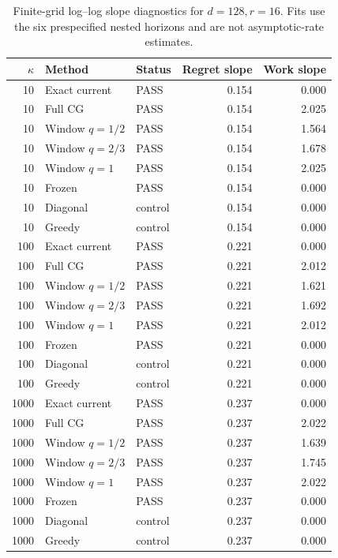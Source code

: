 \begin{table}[p]
\centering\scriptsize
\begin{tabular}{rllrr}
\toprule
$\kappa$ & Method & Status & Regret slope & Work slope \\
\midrule
10 & Exact current & PASS & 0.154 & 0.000 \\
10 & Full CG & PASS & 0.154 & 2.025 \\
10 & Window $q=1/2$ & PASS & 0.154 & 1.564 \\
10 & Window $q=2/3$ & PASS & 0.154 & 1.678 \\
10 & Window $q=1$ & PASS & 0.154 & 2.025 \\
10 & Frozen & PASS & 0.154 & 0.000 \\
10 & Diagonal & control & 0.154 & 0.000 \\
10 & Greedy & control & 0.154 & 0.000 \\
100 & Exact current & PASS & 0.221 & 0.000 \\
100 & Full CG & PASS & 0.221 & 2.012 \\
100 & Window $q=1/2$ & PASS & 0.221 & 1.621 \\
100 & Window $q=2/3$ & PASS & 0.221 & 1.692 \\
100 & Window $q=1$ & PASS & 0.221 & 2.012 \\
100 & Frozen & PASS & 0.221 & 0.000 \\
100 & Diagonal & control & 0.221 & 0.000 \\
100 & Greedy & control & 0.221 & 0.000 \\
1000 & Exact current & PASS & 0.237 & 0.000 \\
1000 & Full CG & PASS & 0.237 & 2.022 \\
1000 & Window $q=1/2$ & PASS & 0.237 & 1.639 \\
1000 & Window $q=2/3$ & PASS & 0.237 & 1.745 \\
1000 & Window $q=1$ & PASS & 0.237 & 2.022 \\
1000 & Frozen & PASS & 0.237 & 0.000 \\
1000 & Diagonal & control & 0.237 & 0.000 \\
1000 & Greedy & control & 0.237 & 0.000 \\
\bottomrule
\end{tabular}
\caption{Finite-grid log--log slope diagnostics for $d=128,r=16$.  Fits use the six prespecified nested horizons and are not asymptotic-rate estimates.}
\label{tab:certified-scaling-fits-3}
\end{table}


